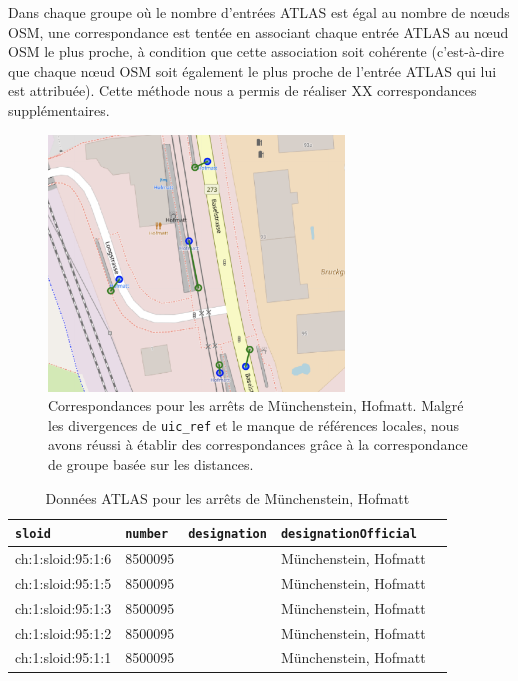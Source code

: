 Dans chaque groupe où le nombre d'entrées ATLAS est égal au nombre de nœuds OSM, une correspondance est tentée en associant chaque entrée ATLAS au nœud OSM le plus proche, à condition que cette association soit cohérente (c'est-à-dire que chaque nœud OSM soit également le plus proche de l'entrée ATLAS qui lui est attribuée). Cette méthode nous a permis de réaliser XX correspondances supplémentaires.

\begin{figure}[h] 
    \centering
    \includegraphics[width=0.7\textwidth]{../figures/correspondances/groupe_proximite.png}
    \caption[Correspondances – Münchenstein, Hofmatt]{Correspondances pour les arrêts de Münchenstein, Hofmatt. Malgré les divergences de \texttt{uic\_ref} et le manque de références locales, nous avons réussi à établir des correspondances grâce à la correspondance de groupe basée sur les distances.}
    \label{fig:group_proximity_munchenstein}
\end{figure}

\FloatBarrier

\begin{table}
\caption[Données ATLAS – Münchenstein, Hofmatt]{Données ATLAS pour les arrêts de Münchenstein, Hofmatt}
\label{tab:atlas_data}
\centering
\begin{tabular}{l l l l l}
\toprule
\texttt{sloid} & \texttt{number} & \texttt{designation} & \texttt{designationOfficial} \\
\midrule
ch:1:sloid:95:1:6 & 8500095 &  & Münchenstein, Hofmatt \\
ch:1:sloid:95:1:5 & 8500095 &  & Münchenstein, Hofmatt \\
ch:1:sloid:95:1:3 & 8500095 &  & Münchenstein, Hofmatt \\
ch:1:sloid:95:1:2 & 8500095 &  & Münchenstein, Hofmatt \\
ch:1:sloid:95:1:1 & 8500095 &  & Münchenstein, Hofmatt \\
\bottomrule
\end{tabular}
\end{table}

